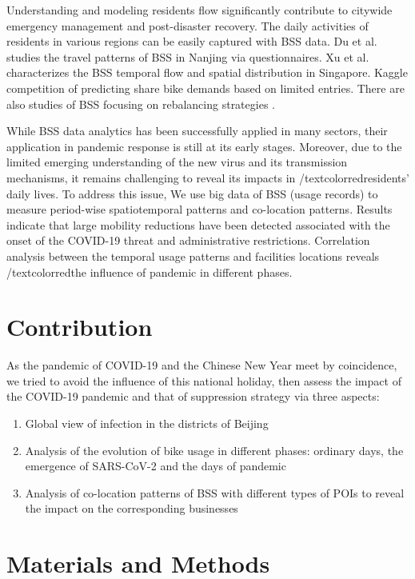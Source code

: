 \documentclass[preprints,ijgi,submit,moreauthors]{Definitions/mdpi}
\begin{document}
Understanding and modeling residents flow significantly contribute to citywide emergency management and post-disaster recovery.
The daily activities of residents in various regions can be easily captured with BSS data. %
Du et al. \cite{du2018better} studies the travel patterns of BSS in Nanjing via questionnaires.
Xu et al. \cite{xu2019unravel} characterizes the BSS temporal flow and spatial distribution in Singapore.
Kaggle \cite{kaggle} competition of predicting share bike demands based on limited entries.
There are also studies of BSS focusing on rebalancing strategies \cite{pal2017free, ai2019deep}.

While BSS data analytics has been successfully applied in many sectors, their application in pandemic response is still at its early stages.
Moreover, due to the limited emerging understanding of the new virus and its transmission mechanisms, it remains challenging to reveal its impacts in /textcolor{red}{residents' daily lives}.
To address this issue, We use big data of BSS (usage records) to measure period-wise spatiotemporal patterns and co-location patterns. 
Results indicate that large mobility reductions have been detected associated with the onset of the COVID-19 threat and administrative restrictions.
Correlation analysis between the temporal usage patterns and facilities locations reveals /textcolor{red}{the influence of pandemic in different phases.} 

\section*{Contribution} As the pandemic of COVID-19 and the Chinese New Year meet by coincidence, we tried to avoid the influence of this national holiday, then assess the impact of the COVID-19 pandemic and that of suppression strategy via three aspects:
\begin{enumerate}
    \item Global view of infection in the districts of Beijing
    \item Analysis of the evolution of bike usage in different phases: ordinary days, the emergence of SARS-CoV-2 and the days of pandemic 
    \item Analysis of co-location patterns of BSS with different types of POIs to reveal the impact on the corresponding businesses
\end{enumerate}



\section{Materials and Methods}
\end{document}
